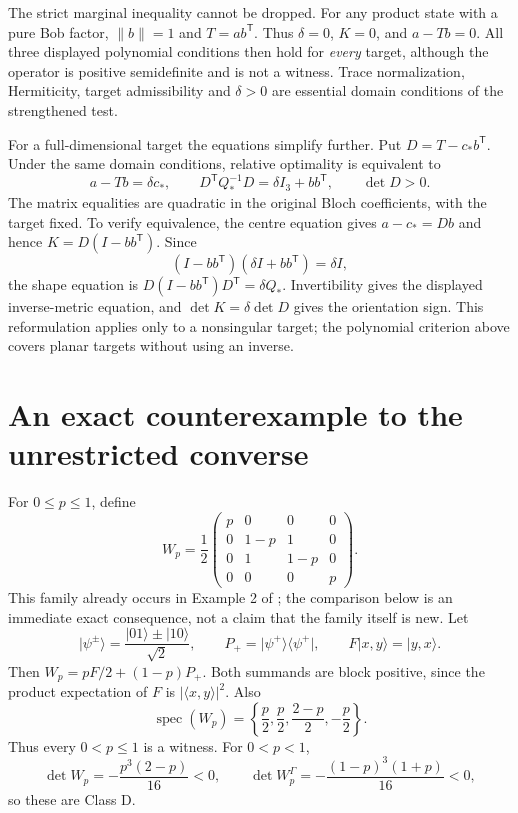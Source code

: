 \documentclass[11pt,a4paper]{article}
\theoremstyle{definition}\newtheorem{definition}[theorem]{Definition}
\newcommand{\ket}[1]{\lvert #1\rangle}
\newcommand{\bra}[1]{\langle #1\rvert}
\newcommand{\proj}[1]{\ket{#1}\bra{#1}}
\newcommand{\cstar}{c_*}
\newcommand{\Qstar}{Q_*}
\theoremstyle{plain}\newtheorem*{theorem*}{Theorem}
\begin{document}
The strict marginal inequality cannot be dropped. For any product state with a pure Bob factor, $\|b\|=1$ and $T=ab^{\mathsf T}$. Thus $\delta=0$, $K=0$, and $a-Tb=0$. All three displayed polynomial conditions then hold for \emph{every} target, although the operator is positive semidefinite and is not a witness. Trace normalization, Hermiticity, target admissibility and $\delta>0$ are essential domain conditions of the strengthened test.

For a full-dimensional target the equations simplify further. Put $D=T-\cstar b^{\mathsf T}$. Under the same domain conditions, relative optimality is equivalent to
\begin{equation}\label{eq:quadratic-optimality}
 \boxed{a-Tb=\delta\cstar,\qquad
 D^{\mathsf T}\Qstar^{-1}D=\delta I_3+bb^{\mathsf T},\qquad
 \det D>0.}
\end{equation}
The matrix equalities are quadratic in the original Bloch coefficients, with the target fixed. To verify equivalence, the centre equation gives $a-\cstar=Db$ and hence $K=D(I-bb^{\mathsf T})$. Since
\[
 (I-bb^{\mathsf T})(\delta I+bb^{\mathsf T})=\delta I,
\]
the shape equation is $D(I-bb^{\mathsf T})D^{\mathsf T}=\delta\Qstar$. Invertibility gives the displayed inverse-metric equation, and $\det K=\delta\det D$ gives the orientation sign. This reformulation applies only to a nonsingular target; the polynomial criterion above covers planar targets without using an inverse.

\section{An exact counterexample to the unrestricted converse}

For $0\leq p\leq1$, define
\begin{equation}\label{eq:Wp}
 W_p=\frac12\begin{pmatrix}
 p&0&0&0\\0&1-p&1&0\\0&1&1-p&0\\0&0&0&p
 \end{pmatrix}.
\end{equation}
This family already occurs in Example 2 of \cite{milne}; the comparison below is an immediate exact consequence, not a claim that the family itself is new. Let
\[
 \ket{\psi^\pm}=\frac{\ket{01}\pm\ket{10}}{\sqrt2},\qquad
 P_+=\proj{\psi^+},\qquad F\ket{x,y}=\ket{y,x}.
\]
Then $W_p=pF/2+(1-p)P_+$. Both summands are block positive, since the product expectation of $F$ is $|\langle x,y\rangle|^2$. Also
\[
 \operatorname{spec}(W_p)=\left\{\frac p2,\frac p2,\frac{2-p}{2},-\frac p2\right\}.
\]
Thus every $0<p\leq1$ is a witness. For $0<p<1$,
\begin{equation}\label{eq:dets}
 \det W_p=-\frac{p^3(2-p)}{16}<0,
 \qquad \det W_p^\Gamma=-\frac{(1-p)^3(1+p)}{16}<0,
\end{equation}
so these are Class D.
\end{document}
